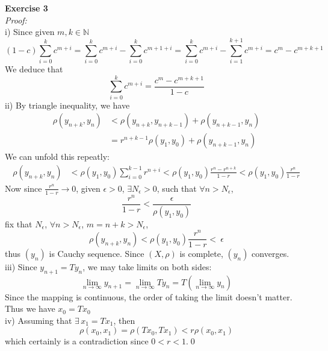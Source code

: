 \documentclass[12pt]{article}
\begin{document}
\textbf{Exercise 3}\\ 
\textit{Proof:}\\
i) Since given $m,k\in \mathbb{N}$
\[
(1-c)\sum_{i=0}^{k}c^{m+i}=\sum_{i=0}^{k}c^{m+i}-\sum_{i=0}^{k}c^{m+1+i}=\sum_{i=0}^{k}c^{m+i}-\sum_{i=1}^{k+1}c^{m+i}=c^m-c^{m+k+1}
\]
We deduce that
\[
\sum_{i=0}^{k}c^{m+i}=\frac{c^m-c^{m+k+1}}{1-c}
\]
ii) By triangle inequality, we have
\begin{align*}
\rho(y_{n+k},y_{n})&<\rho(y_{n+k},y_{n+k-1})+\rho(y_{n+k-1},y_{n})\\
			       &=r^{n+k-1}\rho(y_1,y_0)+	\rho(y_{n+k-1},y_{n})
\end{align*}			    
We can unfold this repeatly:
\begin{align*}
\rho(y_{n+k},y_{n})&<\rho(y_1,y_0)\sum_{i=0}^{k-1}r^{n+i}<\rho(y_1,y_0)\frac{r^n-r^{n+k}}{1-r}	<\rho(y_1,y_0)\frac{r^n}{1-r}		    		
\end{align*}
Now since $\frac{r^n}{1-r}\to 0$, given $\epsilon>0$, $\exists N_{\epsilon}>0$, such that $\forall n>N_{\epsilon}$,
\[
\frac{r^n}{1-r}<\frac{\epsilon}{\rho(y_1,y_0)}
\]
fix that $N_{\epsilon}$, $\forall n>N_{\epsilon}$, $m=n+k>N_{\epsilon}$, 
\[
\rho(y_{n+k},y_{n})<\rho(y_1,y_0)\frac{r^n}{1-r}<~\epsilon
\]
thus $(y_n)$ is Cauchy sequence. Since $(X,\rho)$ is complete, $(y_n)$ converges.\\
iii) Since $y_{n+1}=Ty_n$, we may take limits on both sides:
\[
\lim_{n\to\infty}y_{n+1}=\lim_{n\to\infty}Ty_n=T(\lim_{n\to\infty}y_n)
\]
Since the mapping is continuous, the order of taking the limit doesn't matter. Thus we have $x_0=Tx_0$\\
iv) Assuming that $\exists\,x_1=Tx_1$, then 
\[
\rho(x_0,x_1)=\rho(Tx_0,Tx_1)<r\rho(x_0,x_1)
\]
which certainly is a contradiction since $0<r<1$.\qed
\end{document}
